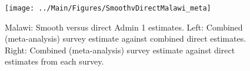 \documentclass[12pt]{article}\usepackage[]{graphicx}\usepackage[]{color}
\newenvironment{knitrout}{}{} %
\begin{document}

\begin{knitrout}
\color{fgcolor}\begin{figure}[bht]

{\centering \texttt{[image: ../Main/Figures/SmoothvDirectMalawi\_meta]} 

}

\caption[Malawi]{Malawi: Smooth versus direct Admin 1 estimates. Left: Combined (meta-analysis) survey estimate against combined direct estimates. Right: Combined (meta-analysis) survey estimate against direct estimates from each survey.}\label{fig:unnamed-chunk-203}
\end{figure}


\end{knitrout}
\end{document}
